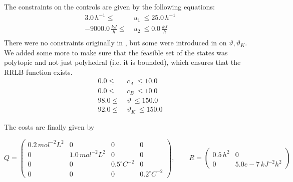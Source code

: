\documentclass[12pt]{article}
\begin{document}
\noindent The constraints on the controls are given by the following equations:
\begin{align*}
	3.0\,h^{-1}\leq &~u_1~ \leq 25.0\,h^{-1}\\
	-9000.0\,\frac{kJ}{h}\leq &~u_2~ \leq 0.0\,\frac{kJ}{h}\\
\end{align*}
There were no constraints originally in \cite{diehl-dissertation}, but some were introduced in \cite{cstr-ref} on $\vartheta,\vartheta_K$.
We added some more to make sure that the feasible set of the states was polytopic and not just polyhedral (i.e. it is bounded), which ensures that the RRLB function exists.
\begin{align*}
	0.0\leq&~c_A~\leq 10.0\\
	0.0\leq&~c_B~\leq 10.0\\
	98.0\leq &~\vartheta~\leq 150.0\\
	92.0\leq &~\vartheta_K~\leq 150.0
\end{align*}

\noindent The costs are finally given by

$$Q=\begin{pmatrix}
	0.2\,mol^{-2}L^2 & 0 & 0 & 0\\
	0 & 1.0\,mol^{-2}L^2 & 0 & 0\\
	0 & 0 & 0.5^\circ C^{-2} & 0\\
	0 & 0 & 0 & 0.2^\circ C^{-2}
\end{pmatrix},\qquad R=\begin{pmatrix}
	0.5\,h^{2} & 0\\
	0 & 5.0e-7\,kJ^{-2}h^2
\end{pmatrix}$$
\end{document}
